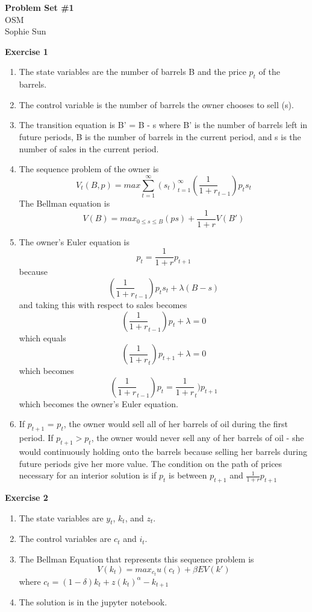 \documentclass[letterpaper,12pt]{article}
\theoremstyle{definition}
\begin{document}
\begin{flushleft}
\textbf{\large{Problem Set \#1}} \\
  OSM \\
  Sophie Sun
 \end{flushleft}
  
  \vspace{3mm}
  \noindent\textbf{Exercise 1}
  \begin{enumerate}
  \item The state variables are the number of barrels B and the price $p_t$ of the barrels.
  \item The control variable is the number of barrels the owner chooses to sell (s).
  \item The transition equation is B' = B - s where B' is the number of barrels left in future periods, B is the number of barrels in the current period, and s is the number of sales in the current period.
  \item The sequence problem of the owner is \[{V_t}(B,p) = max \sum_{t=1}^{\infty} {(s_t)}_{t = 1}^{\infty} (\frac{1}{1+r}_{t-1}) {p_t} {s_t} \]
  The Bellman equation is \[V(B) = max_{0 \leq s \leq B} ({ps}) + \frac{1}{1+r} V(B')\]
  \item The owner's Euler equation is \[{p_t} = \frac {1}{1+r} {p_{t+1}}\] because \[(\frac{1}{1+r}_{t-1}) {p_t} {s_t} + \lambda(B - s) \] and taking this with respect to sales becomes \[(\frac{1}{1+r}_{t-1}) {p_t} + \lambda = 0 \] which equals \[(\frac{1}{1+r}_{t}) {p_{t+1}} + \lambda = 0 \] which becomes \[(\frac{1}{1+r}_{t-1}) {p_t} = \frac{1}{1+r}_{t}) {p_{t+1}} \] which becomes the owner's Euler equation.
  \item If $p_{t+1}$ = $p_t$, the owner would sell all of her barrels of oil during the first period. If $p_{t+1} > p_t$, the owner would never sell any of her barrels of oil - she would continuously holding onto the barrels because selling her barrels during future periods give her more value. The condition on the path of prices necessary for an interior solution is if $p_t$ is between $p_{t+1}$ and $\frac {1}{1+r} {p_{t+1}}$
  \end{enumerate}
  
  \noindent\textbf{Exercise 2}
  \begin{enumerate}
  \item The state variables are $y_t$, $k_t$, and $z_t$.
  \item The control variables are $c_t$ and $i_t$.
  \item The Bellman Equation that represents this sequence problem is \[V(k_t) = max_{c_t} u(c_t) + \beta E V(k')\] where $c_t = (1 - \delta) k_t + z(k_t)^\alpha - k_{t+1}$
  \item The solution is in the jupyter notebook.
  \end{enumerate}
  
\end{document}
